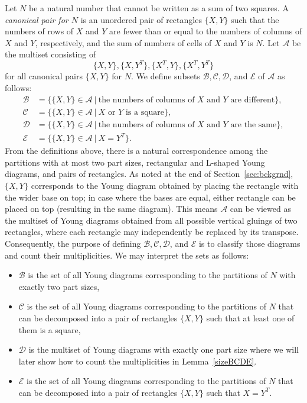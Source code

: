 \documentclass[a4paper,oneside,reqno]{amsart}
\theoremstyle{plain}
\theoremstyle{definition}
\theoremstyle{remark}
\newcommand{\A}{\mathcal{A}}
\newcommand{\B}{\mathcal{B}}
\newcommand{\C}{\mathcal{C}}
\newcommand{\D}{\mathcal{D}}
\newcommand{\E}{\mathcal{E}}
\begin{document}
    Let $N$ be a natural number that cannot be written as a sum of two squares. A {\em canonical pair for $N$} is an unordered pair of rectangles $\{X,Y\}$ such that the numbers of rows of $X$ and $Y$ are fewer than or equal to the numbers of columns of $X$ and $Y$, respectively, and the sum of numbers of cells of $X$ and $Y$ is $N$. Let $\A$ be the multiset consisting of 
    \[
    \{X,Y\}, \{X,Y^T\}, \{X^T,Y\}, \{X^T,Y^T\}
    \]
    for all canonical pairs $\{X,Y\}$ for $N$. We define subsets $\mathcal{B}, \mathcal{C}, \mathcal{D}$, and $\mathcal{E}$ of $\A$ as follows: 
    \begin{align*}
        \mathcal{B} &= \{\{X,Y\} \in \A \ | \ \text{the numbers of columns of $X$ and $Y$ are different}\}, \\
        \mathcal{C} &= \{\{X,Y\} \in \A \ | \ \text{$X$ or $Y$ is a square}\}, \\
        \mathcal{D} &= \{\{X,Y\} \in \A \ | \ \text{the numbers of columns of $X$ and $Y$ are the same}\}, \\
        \mathcal{E} &= \{\{X,Y\} \in \A \ | \ \text{$X = Y^T$}\}. 
    \end{align*}
    From the definitions above, there is a natural correspondence among the partitions with at most two part sizes, rectangular and L-shaped Young diagrams, and pairs of rectangles. As noted at the end of Section~\ref{sec:bckgrnd}, $\{X,Y\}$ corresponds to the Young diagram obtained by placing the rectangle with the wider base on top; in case where the bases are equal, either rectangle can be placed on top (resulting in the same diagram). This means $\A$ can be viewed as the multiset of Young diagrams obtained from all possible vertical gluings of two rectangles, where each rectangle may independently be replaced by its transpose. Consequently, the purpose of defining $\B, \C, \D$, and $\E$ is to classify those diagrams and count their multiplicities. We may interpret the sets as follows: 
    \begin{itemize}
        \item $\B$ is the set of all Young diagrams corresponding to the partitions of $N$ with exactly two part sizes, 
        \item $\C$ is the set of all Young diagrams corresponding to the partitions of $N$ that can be decomposed into a pair of rectangles $\{X,Y\}$ such that at least one of them is a square, 
        \item $\D$ is the multiset of Young diagrams with exactly one part size where we will later show how to count the multiplicities in Lemma~\ref{sizeBCDE}. 
        \item $\E$ is the set of all Young diagrams corresponding to the partitions of $N$ that can be decomposed into a pair of rectangles $\{X,Y\}$ such that $X = Y^T$. 
    \end{itemize}
    
\end{document}
